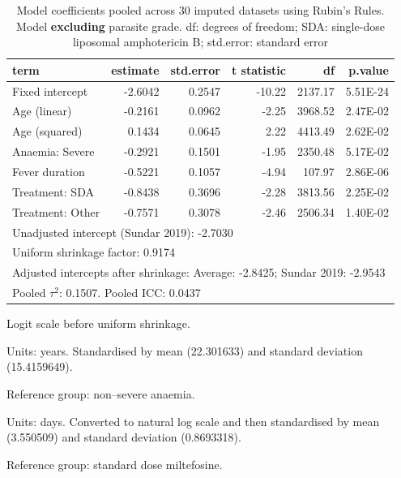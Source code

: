 \begin{table}[tb]
  \centering
  \begin{threeparttable}
    \begin{tabular}{lrrrrr}
      \toprule
      term                      & estimate\tnote{1} & std.error & t statistic & df      & p.value     \\
      \midrule
      Fixed intercept           & -2.6042           & 0.2547    & -10.22      & 2137.17 & 5.51E-24    \\
      Age (linear)\tnote{2}     & -0.2161           & 0.0962    & -2.25       & 3968.52 & 2.47E-02    \\
      Age (squared)\tnote{2}    & 0.1434            & 0.0645    & 2.22        & 4413.49 & 2.62E-02    \\
      Anaemia: Severe\tnote{3}  & -0.2921           & 0.1501    & -1.95       & 2350.48 & 5.17E-02    \\
      Fever duration\tnote{3}   & -0.5221           & 0.1057    & -4.94       & 107.97  & 2.86E-06    \\
      Treatment: SDA\tnote{4}   & -0.8438           & 0.3696    & -2.28       & 3813.56 & 2.25E-02    \\
      Treatment: Other\tnote{4} & -0.7571           & 0.3078    & -2.46       & 2506.34 & 1.40E-02    \\
      \midrule
      \multicolumn{6}{l}{Unadjusted intercept (Sundar 2019): -2.7030}                                 \\
      \midrule
      \multicolumn{6}{l}{Uniform shrinkage factor: 0.9174}                                            \\
      \midrule
      \multicolumn{6}{l}{Adjusted intercepts after shrinkage: Average: -2.8425; Sundar 2019: -2.9543} \\
      \midrule
      \multicolumn{6}{l}{Pooled $\tau^2$: 0.1507. Pooled ICC: 0.0437}                                 \\
      \bottomrule
    \end{tabular}
    \begin{tablenotes}
      \footnotesize
      \item[1] Logit scale before uniform shrinkage.
      \item[2] Units: years. Standardised by mean (22.301633) and standard deviation (15.4159649).
      \item[3] Reference group: non--severe anaemia.
      \item[4] Units: days. Converted to natural log scale and then standardised by mean (3.550509) and standard deviation (0.8693318).
      \item[5] Reference group: standard dose miltefosine.
    \end{tablenotes}
  \end{threeparttable}
  \caption{Model coefficients pooled across 30 imputed datasets using Rubin's Rules. Model \textbf{excluding} parasite grade. df: degrees of freedom; SDA: single-dose liposomal amphotericin B; std.error: standard error}
  \label{tab:isc_model_coeff_without_pg}
\end{table}
